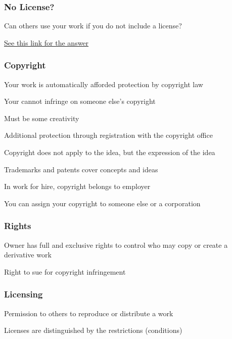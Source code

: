 \documentclass[t,12pt,numbers,fleqn]{beamer}
\begin{document}

\begin{frame}
\frametitle{No License?}

\bi
\item Can others use your work if you do not include a license?
\item \href{http://choosealicense.com/no-license/}{See this link for the answer}
\ei

\end{frame}


\begin{frame}
\frametitle{Copyright}

\bi
\item Your work is automatically afforded protection by copyright law
\bi
\item Your cannot infringe on someone else's copyright
\item Must be some creativity
\ei
\item Additional protection through registration with the copyright office
\item Copyright does not apply to the idea, but the expression of the idea
\item Trademarks and patents cover concepts and ideas
\item In work for hire, copyright belongs to employer
\item You can assign your copyright to someone else or a corporation
\ei

\end{frame}


\begin{frame}
\frametitle{Rights}

\bi
\item Owner has full and exclusive rights to control who may copy or create a
  derivative work
\item Right to sue for copyright infringement
\ei

\end{frame}


\begin{frame}
\frametitle{Licensing}

\bi
\item Permission to others to reproduce or distribute a work
\item Licenses are distinguished by the restrictions (conditions)
\ei

\end{frame}
\end{document}
